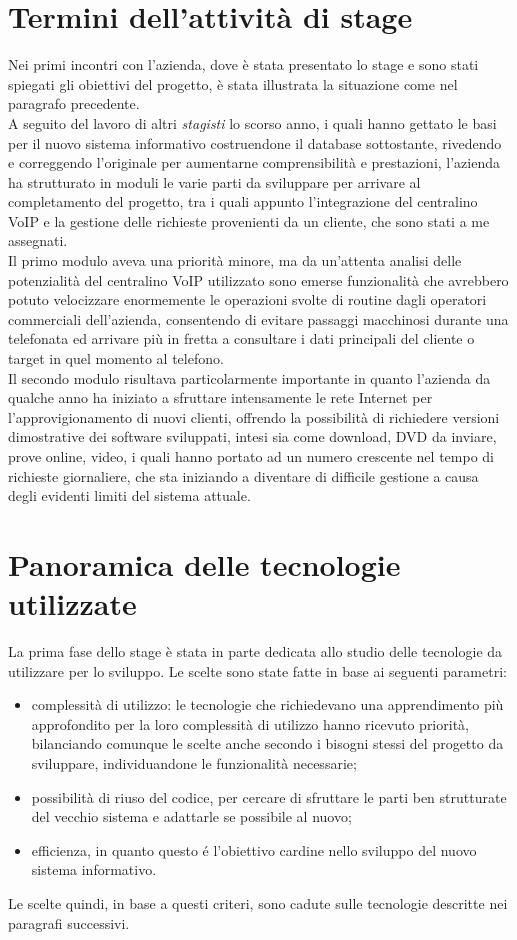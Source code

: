 \section{Termini dell'attivit\` a di stage}
Nei primi incontri con l'azienda, dove \` e stata presentato lo stage e sono stati spiegati gli obiettivi del progetto, \` e stata illustrata la situazione come nel paragrafo precedente. \\
A seguito del lavoro di altri \textit{stagisti} lo scorso anno, i quali hanno gettato le basi per il nuovo sistema informativo costruendone il database sottostante, rivedendo e correggendo l'originale per aumentarne comprensibilit\` a e prestazioni, l'azienda ha strutturato in moduli le varie parti da sviluppare per arrivare al completamento del progetto, tra i quali appunto l'integrazione del centralino VoIP e la gestione delle richieste provenienti da un cliente, che sono stati a me assegnati. \\
Il primo modulo aveva una priorit\` a minore, ma da un'attenta analisi delle potenzialit\` a del centralino VoIP utilizzato sono emerse funzionalit\` a che avrebbero potuto velocizzare enormemente le operazioni svolte di routine dagli operatori commerciali dell'azienda, consentendo di evitare passaggi macchinosi durante una telefonata ed arrivare pi\` u in fretta a consultare i dati principali del cliente o target in quel momento al telefono.\\
Il secondo modulo risultava particolarmente importante in quanto l'azienda da qualche anno ha iniziato a sfruttare intensamente le rete Internet per l'approvigionamento di nuovi clienti, offrendo la possibilit\` a di richiedere versioni dimostrative dei software sviluppati, intesi sia come download, DVD da inviare, prove online, video, i quali hanno portato ad un numero crescente nel tempo di richieste giornaliere, che sta iniziando a diventare di difficile gestione a causa degli evidenti limiti del sistema attuale. 


\section{Panoramica delle tecnologie utilizzate}
La prima fase dello stage \`e stata in parte dedicata allo studio delle tecnologie da utilizzare per lo sviluppo. Le scelte sono state fatte in base ai seguenti parametri:
\begin{itemize}
  \item complessit\`a di utilizzo: le tecnologie che richiedevano una apprendimento pi\`u approfondito per la loro 
  complessit\`a di utilizzo hanno ricevuto priorit\`a, bilanciando comunque le scelte anche secondo i bisogni stessi del
progetto da sviluppare, individuandone le funzionalit\`a necessarie;
  \item possibilit\`a di riuso del codice, per cercare di sfruttare le parti ben strutturate del vecchio sistema e adattarle se possibile al nuovo;
  \item efficienza, in quanto questo \'e l'obiettivo cardine nello sviluppo del nuovo sistema informativo.
\end{itemize}
\noindent
Le scelte quindi, in base a questi criteri, sono cadute sulle tecnologie descritte nei paragrafi successivi.

